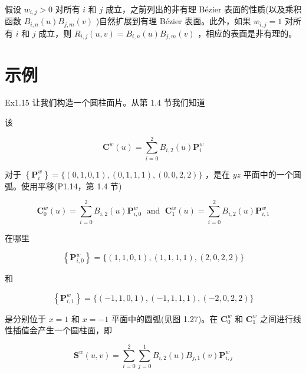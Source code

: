 \documentclass[../main.tex]{subfiles}
\begin{document}
假设 \({w}_{i,j} > 0\) 对所有 \(i\) 和 \(j\) 成立，之前列出的非有理 Bézier 表面的性质(以及乘积函数 \({B}_{i,n}\left( u\right) {B}_{j,m}\left( v\right)\) )自然扩展到有理 Bézier 表面。此外，如果 \({w}_{i,j} = 1\) 对所有 \(i\) 和 \(j\) 成立，则 \({R}_{i,j}\left( {u,v}\right)  = {B}_{i,n}\left( u\right) {B}_{j,m}\left( v\right)\) ，相应的表面是非有理的。

\section*{示例}

\noindent\begin{minipage}{\linewidth}
Ex1.15 让我们构造一个圆柱面片。从第 1.4 节我们知道

该

\[
{\mathbf{C}}^{w}\left( u\right)  = \mathop{\sum }\limits_{{i = 0}}^{2}{B}_{i,2}\left( u\right) {\mathbf{P}}_{i}^{w}
\]

对于 \(\left\{  {\mathbf{P}}_{i}^{w}\right\}   = \{ \left( {0,1,0,1}\right) ,\left( {0,1,1,1}\right) ,\left( {0,0,2,2}\right) \}\) ，是在 \({yz}\) 平面中的一个圆弧。使用平移(P1.14，第 1.4 节)

\[
{\mathbf{C}}_{0}^{w}\left( u\right)  = \mathop{\sum }\limits_{{i = 0}}^{2}{B}_{i,2}\left( u\right) {\mathbf{P}}_{i,0}^{w}\;\text{ and }\;{\mathbf{C}}_{1}^{w}\left( u\right)  = \mathop{\sum }\limits_{{i = 0}}^{2}{B}_{i,2}\left( u\right) {\mathbf{P}}_{i,1}^{w}
\]


在哪里

\[
\left\{  {\mathbf{P}}_{i,0}^{w}\right\}   = \{ \left( {1,1,0,1}\right) ,\left( {1,1,1,1}\right) ,\left( {2,0,2,2}\right) \}
\]

和

\[
\left\{  {\mathbf{P}}_{i,1}^{w}\right\}   = \{ \left( {-1,1,0,1}\right) ,\left( {-1,1,1,1}\right) ,\left( {-2,0,2,2}\right) \}
\]

是分别位于 \(x = 1\) 和 \(x =  - 1\) 平面中的圆弧(见图 1.27)。在 \({\mathbf{C}}_{0}^{w}\) 和 \({\mathbf{C}}_{1}^{w}\) 之间进行线性插值会产生一个圆柱面，即

\[
{\mathbf{S}}^{w}\left( {u,v}\right)  = \mathop{\sum }\limits_{{i = 0}}^{2}\mathop{\sum }\limits_{{j = 0}}^{1}{B}_{i,2}\left( u\right) {B}_{j,1}\left( v\right) {\mathbf{P}}_{i,j}^{w}
\]


\end{minipage}
\end{document}

